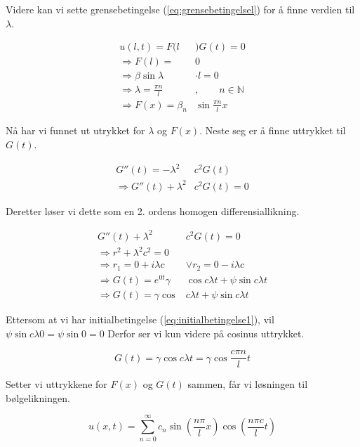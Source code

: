 Videre kan vi sette grensebetingelse (\ref{eq:grensebetingelsel}) for å finne verdien til $\lambda$.

\begin{align*}
	u(l ,t) = F(l&)G(t) = 0 \\
	\Rightarrow F(l) =& 0 \\
	\Rightarrow \beta \sin \lambda &\cdot l = 0 \\ 
	\Rightarrow \lambda = \frac{\pi n}{l}&, \qquad n \in \mathbb{N} \\
	\Rightarrow F(x) = { \beta }_n & \sin \frac{\pi n}{l} x
\end{align*}

Nå har vi funnet ut utrykket for $\lambda$ og $F(x)$. Neste seg er å finne uttrykket til $G(t)$.

\begin{align*}
	G''(t) = - \lambda^2 & c^2 G(t) \\
	\Rightarrow G''(t) + \lambda^2 & c^2 G(t) = 0 
\end{align*}

Deretter løser vi dette som en 2. ordens homogen differensiallikning.

\begin{align*}
	G''(t) + \lambda^2 & c^2 G(t) = 0 \\
	\Rightarrow r^2 + \lambda^2 c^2 = 0 \\
	\Rightarrow r_1 = 0 + i \lambda c &\vee r_2 = 0 - i \lambda c \\ 
	\Rightarrow G(t) = e^{0 t} \gamma&\cos c \lambda t + \psi \sin c \lambda t \\
	\Rightarrow G(t) = \gamma\cos & c \lambda t + \psi \sin c \lambda t
\end{align*}

Ettersom at vi har initialbetingelse (\ref{eq:initialbetingelse1}), vil $\psi \sin c \lambda 0 =\psi \sin 0 = 0$
Derfor ser vi kun videre på cosinus uttrykket. 

\begin{equation*}
	G(t) = \gamma \cos c \lambda t = \gamma \cos \frac{c \pi n}{l} t
\end{equation*}

Setter vi uttrykkene for $F(x)$ og $G(t)$ sammen, får vi løsningen til bølgelikningen.

\begin{equation}
	u(x,t) = \sum_{n=0}^{\infty} c_n 
	\sin \left( \frac{n \pi}{l} x \right)
	\cos \left( \frac{n \pi c}{l} t \right)
	\label{eq:bølgelikningLøst}	
\end{equation}

